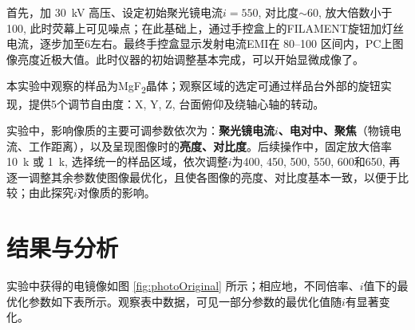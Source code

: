 \documentclass[aps,pre,12pt,preprint,%
	onecolumn,showpacs,showkeys,nofootinbib]{revtex4-1}
\begin{document}
	首先，加 \SI{30}{\kV} 高压、设定初始聚光镜电流$i = 550$, 对比度$\sim 60$, 放大倍数小于100, 此时荧幕上可见噪点；在此基础上，通过手控盒上的FILAMENT旋钮加灯丝电流，逐步加至6左右。最终手控盒显示发射电流EMI在 \numrange{80}{100} 区间内，PC上图像亮度近极大值。此时仪器的初始调整基本完成，可以开始显微成像了。
	
\newpage
	本实验中观察的样品为MgF\textsubscript{2}晶体；观察区域的选定可通过样品台外部的旋钮实现，提供5个调节自由度：X, Y, Z, 台面俯仰及绕轴心轴的转动。
	
	实验中，影响像质的主要可调参数依次为：\textbf{聚光镜电流$i$、电对中、聚焦}（物镜电流、工作距离），以及呈现图像时的\textbf{亮度、对比度}。后续操作中，固定放大倍率 \SI{10}{k} 或 \SI{1}{k}, 选择统一的样品区域，依次调整$i$为400, 450, 500, 550, 600和650, 再逐一调整其余参数使图像最优化，且使各图像的亮度、对比度基本一致，以便于比较；由此探究$i$对像质的影响。
\section{结果与分析}
%
%
	实验中获得的电镜像如图 \ref{fig:photoOriginal} 所示；相应地，不同倍率、$i$值下的最优化参数如下表所示。观察表中数据，可见一部分参数的最优化值随$i$有显著变化。
	
\end{document}
